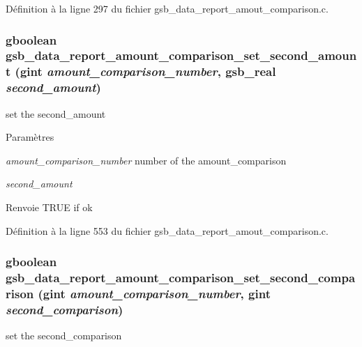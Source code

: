 Définition à la ligne 297 du fichier gsb\_\-data\_\-report\_\-amout\_\-comparison.c.

\subsubsection[{gsb\_\-data\_\-report\_\-amount\_\-comparison\_\-set\_\-second\_\-amount}]{\setlength{\rightskip}{0pt plus 5cm}gboolean gsb\_\-data\_\-report\_\-amount\_\-comparison\_\-set\_\-second\_\-amount (gint {\em amount\_\-comparison\_\-number}, \/  {\bf gsb\_\-real} {\em second\_\-amount})}\label{gsb__data__report__amout__comparison_8c_a2d5858a8324ffa1770b7b2e7d267b6a6}
set the second\_\-amount


\begin{DoxyParams}{Paramètres}
\item[{\em amount\_\-comparison\_\-number}]number of the amount\_\-comparison \item[{\em second\_\-amount}]\end{DoxyParams}
\begin{DoxyReturn}{Renvoie}
TRUE if ok 
\end{DoxyReturn}


Définition à la ligne 553 du fichier gsb\_\-data\_\-report\_\-amout\_\-comparison.c.

\subsubsection[{gsb\_\-data\_\-report\_\-amount\_\-comparison\_\-set\_\-second\_\-comparison}]{\setlength{\rightskip}{0pt plus 5cm}gboolean gsb\_\-data\_\-report\_\-amount\_\-comparison\_\-set\_\-second\_\-comparison (gint {\em amount\_\-comparison\_\-number}, \/  gint {\em second\_\-comparison})}\label{gsb__data__report__amout__comparison_8c_aad69a64a4812fbcd158c43adecfab362}
set the second\_\-comparison



